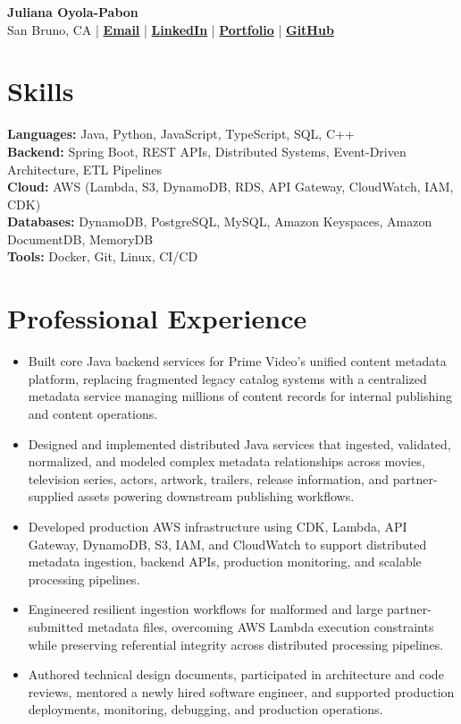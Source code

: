 \documentclass[10pt,letterpaper]{article}
\begin{document}
\begin{center}
{\LARGE\bfseries\color{Accent} Juliana Oyola-Pabon}\\[4pt]
San Bruno, CA
\;|\;
\href{mailto:julianaaoyola@gmail.com}{\textbf{Email}}
\;|\;
\href{https://linkedin.com/in/julianaoyola}{\textbf{LinkedIn}}
\;|\;
\href{https://juliana-portfolio-two.vercel.app/}{\textbf{Portfolio}}
\;|\;
\href{https://github.com/julsoyola}{\textbf{GitHub}}
\end{center}

\vspace{-2pt}

\section*{Skills}

\textbf{Languages:} Java, Python, JavaScript, TypeScript, SQL, C++ \\
\textbf{Backend:} Spring Boot, REST APIs, Distributed Systems, Event-Driven Architecture, ETL Pipelines \\
\textbf{Cloud:} AWS (Lambda, S3, DynamoDB, RDS, API Gateway, CloudWatch, IAM, CDK) \\
\textbf{Databases:} DynamoDB, PostgreSQL, MySQL, Amazon Keyspaces, Amazon DocumentDB, MemoryDB \\
\textbf{Tools:} Docker, Git, Linux, CI/CD

\section*{Professional Experience}


\begin{itemize}
\item Built core Java backend services for Prime Video's unified content metadata platform, replacing fragmented legacy catalog systems with a centralized metadata service managing millions of content records for internal publishing and content operations.
\item Designed and implemented distributed Java services that ingested, validated, normalized, and modeled complex metadata relationships across movies, television series, actors, artwork, trailers, release information, and partner-supplied assets powering downstream publishing workflows.
\item Developed production AWS infrastructure using CDK, Lambda, API Gateway, DynamoDB, S3, IAM, and CloudWatch to support distributed metadata ingestion, backend APIs, production monitoring, and scalable processing pipelines.
\item Engineered resilient ingestion workflows for malformed and large partner-submitted metadata files, overcoming AWS Lambda execution constraints while preserving referential integrity across distributed processing pipelines.
\item Authored technical design documents, participated in architecture and code reviews, mentored a newly hired software engineer, and supported production deployments, monitoring, debugging, and production operations.
\end{itemize}
\end{document}
